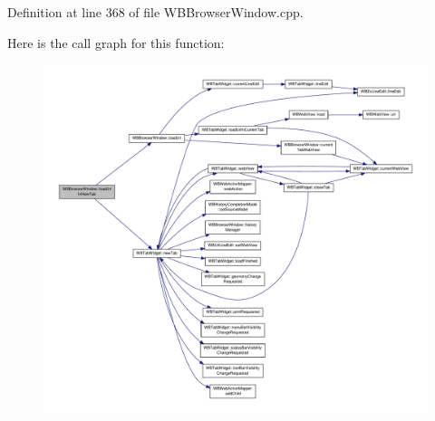 Definition at line 368 of file W\-B\-Browser\-Window.\-cpp.



Here is the call graph for this function\-:
\nopagebreak
\begin{figure}[H]
\begin{center}
\leavevmode
\includegraphics[width=350pt]{d4/d1c/class_w_b_browser_window_af69e6d75a7cab843ebf8fc1bbdce0e89_cgraph}
\end{center}
\end{figure}


